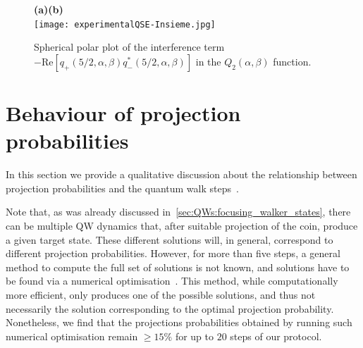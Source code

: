 \begin{figure}[tb]
    \centering
    {\bf (a)}\hskip8cm{\bf (b)}\\
    \texttt{[image: experimentalQSE-Insieme.jpg]}
    \caption{Spherical polar plot of the interference term $-\text{Re}[q_+(5/2,\alpha,\beta)q^*_-(5/2,\alpha,\beta)]$ in the $Q_2(\alpha,\beta)$ function.}
    \label{insieme}
\end{figure}


\section{Behaviour of projection probabilities}
\label{sec:expQWs:projection_probs}

In this section we provide a qualitative discussion about the relationship between projection probabilities and the quantum walk steps~\cite{innocenti2017quantum}.

Note that, as was already discussed in~\cref{sec:QWs:focusing_walker_states}, there can be multiple \ac{QW} dynamics that, after suitable projection of the coin, produce a given target state.
These different solutions will, in general, correspond to different projection probabilities.
However, for more than five steps, a general method to compute the full set of solutions is not known, and solutions have to be found via a numerical optimisation~\cite{innocenti2017quantum}.
This method, while computationally more efficient, only produces one of the possible solutions, and thus not necessarily the solution corresponding to the optimal projection probability.
Nonetheless, we find that the projections probabilities obtained by running such numerical optimisation remain $\ge 15\%$ for up to $20$ steps of our protocol. 

